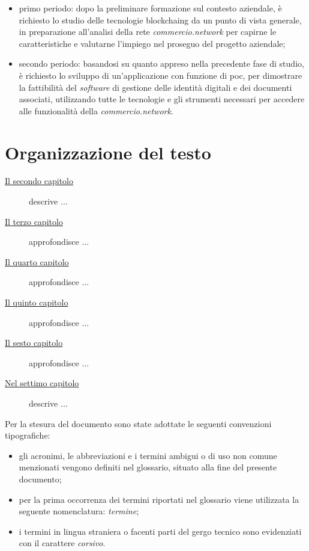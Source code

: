 \begin{itemize}
	\item primo periodo: dopo la preliminare formazione sul contesto aziendale, è richiesto lo studio delle tecnologie \gls{blockchaing} da un punto di vista generale, in preparazione all'analisi della rete \textit{commercio.network} per capirne le caratteristiche e valutarne l'impiego nel proseguo del progetto aziendale;
	\item secondo periodo: basandosi su quanto appreso nella precedente fase di studio, è richiesto lo sviluppo di un'applicazione con funzione di \gls{poc}\glsfirstoccur{}, per dimostrare la fattibilità del \textit{software} di gestione delle identità digitali e dei documenti associati, utilizzando tutte le tecnologie e gli strumenti necessari per accedere alle funzionalità della \textit{commercio.network}. 
 \end{itemize}

\section{Organizzazione del testo}

\begin{description}
    \item[{\hyperref[cap:stage]{Il secondo capitolo}}] descrive ...
    
    \item[{\hyperref[cap:descrizione-stage]{Il terzo capitolo}}] approfondisce ...
    
    \item[{\hyperref[cap:analisi-requisiti]{Il quarto capitolo}}] approfondisce ...
    
    \item[{\hyperref[cap:progettazione-codifica]{Il quinto capitolo}}] approfondisce ...
    
    \item[{\hyperref[cap:verifica-validazione]{Il sesto capitolo}}] approfondisce ...
    
    \item[{\hyperref[cap:conclusioni]{Nel settimo capitolo}}] descrive ...
\end{description}

Per la stesura del documento sono state adottate le seguenti convenzioni tipografiche:
\begin{itemize}
	\item gli acronimi, le abbreviazioni e i termini ambigui o di uso non comune menzionati vengono definiti nel glossario, situato alla fine del presente documento;
	\item per la prima occorrenza dei termini riportati nel glossario viene utilizzata la seguente nomenclatura: \emph{termine}\glsfirstoccur;
	\item i termini in lingua straniera o facenti parti del gergo tecnico sono evidenziati con il carattere \emph{corsivo}.
\end{itemize}